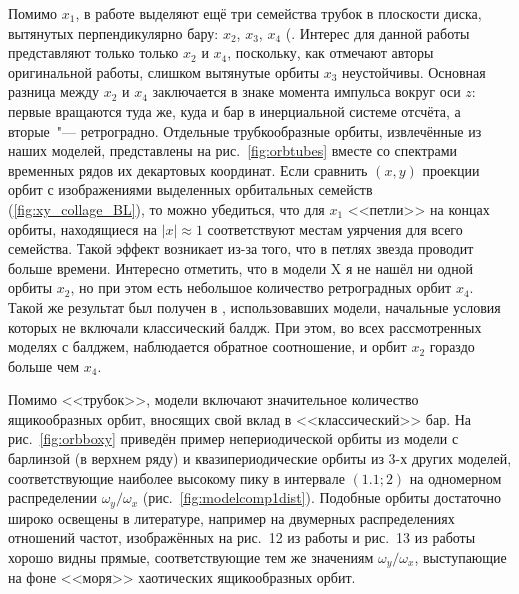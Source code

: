 \documentclass[tikz]{trlnotes}
\begin{document}
Помимо $x_1$, в работе \citet{contopoulos1980a} выделяют ещё три семейства трубок в плоскости диска, вытянутых перпендикулярно бару: $x_2$, $x_3$, $x_4$ (\cite[стр.~185]{2008gady.book.....B}. Интерес для данной работы представляют только только $x_2$ и $x_4$, поскольку, как отмечают авторы оригинальной работы, слишком вытянутые орбиты $x_3$ неустойчивы. Основная разница между $x_2$ и $x_4$ заключается в знаке момента импульса вокруг оси $z$: первые
вращаются туда же, куда и бар в инерциальной системе отсчёта, а вторые~"--- ретроградно. Отдельные трубкообразные орбиты,
извлечённые из наших моделей, представлены на рис.~\ref{fig:orbtubes} вместе со спектрами временных рядов их декартовых координат. 
Если сравнить $(x,y)$ проекции орбит с изображениями выделенных орбитальных семейств (\ref{fig:xy_collage_BL}), то можно убедиться, что для $x_1$ <<петли>> на концах орбиты, находящиеся на $|x|\approx 1$ соответствуют местам уярчения для всего семейства. Такой эффект возникает из-за того, что в петлях звезда проводит больше времени.
Интересно отметить, что в модели X я не нашёл ни одной орбиты $x_2$, но при этом есть небольшое количество ретроградных орбит $x_4$. Такой же результат был получен в \citet{valluri2016,voglis2007}, использовавших модели, начальные условия которых не включали классический балдж. При этом, во всех рассмотренных моделях с балджем, наблюдается обратное соотношение, и орбит $x_2$ гораздо больше чем $x_4$.

Помимо <<трубок>>, модели включают значительное количество ящикообразных орбит, вносящих свой вклад в <<классический>> бар. На рис.~\ref{fig:orbboxy} приведён пример непериодической орбиты из модели с барлинзой (в верхнем ряду) и квазипериодические орбиты из 3-х других моделей, соответствующие наиболее высокому пику в интервале $(1.1;2)$ на одномерном распределении $ω_y/ω_x$ (рис.~\ref{fig:modelcomp1dist}).
Подобные орбиты достаточно широко освещены в литературе, например на двумерных распределениях отношений частот, изображённых
на рис.~12 из работы \citet{gajda2016} и рис.~13 из работы \citet{valluri2016} хорошо видны прямые, соответствующие тем же
значениям $ω_y/ω_x$, выступающие на фоне <<моря>> хаотических  ящикообразных орбит.
\end{document}
